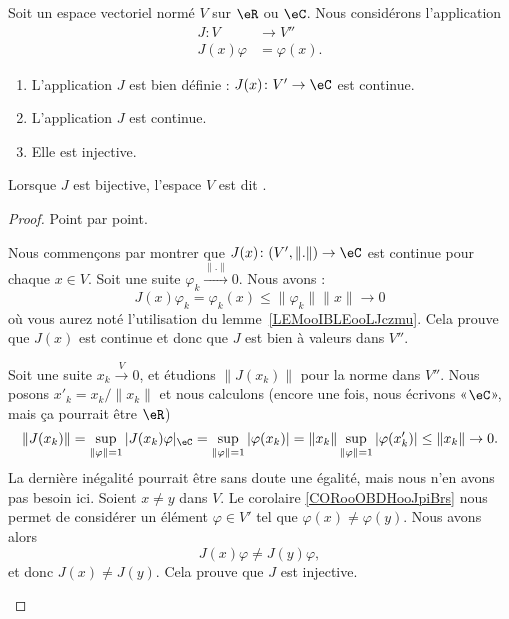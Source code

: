 \begin{propositionDef}      \label{PROPooMAQSooCGFBBM}
	Soit un espace vectoriel normé \( V\) sur \( \eR\) ou \( \eC\). Nous considérons l'application
	\begin{equation}
		\begin{aligned}
			J\colon V   & \to V''       \\
			J(x)\varphi & = \varphi(x).
		\end{aligned}
	\end{equation}
	\begin{enumerate}
		\item       \label{ITEMooNVVSooNFXgnE}
		      L'application \( J\) est bien définie : \( J(x)\colon V'\to \eC\) est continue.
		\item       \label{ITEMooKURHooZZWpbu}
		      L'application \( J\) est continue.
		\item       \label{ITEMooTFYVooKhMOjp}
		      Elle est injective.
	\end{enumerate}

	Lorsque \( J\) est bijective, l'espace \( V\) est dit .
\end{propositionDef}

\begin{proof}
	Point par point.
	\begin{subproof}
		\spitem[\ref{ITEMooNVVSooNFXgnE}]
		Nous commençons par montrer que \( J(x)\colon (V',\| . \|)\to \eC\) est continue pour chaque \( x\in V\). Soit une suite \( \varphi_k\stackrel{\| . \|}{\longrightarrow}0\). Nous avons :
		\begin{equation}
			J(x)\varphi_k=\varphi_k(x)\leq \| \varphi_k \|\| x \|\to 0
		\end{equation}
		où vous aurez noté l'utilisation du lemme~\ref{LEMooIBLEooLJczmu}.  Cela prouve que \( J(x)\) est continue et donc que \( J\) est bien à valeurs dans \( V''\).
		\spitem[\ref{ITEMooKURHooZZWpbu}]

		Soit une suite \( x_k\stackrel{V}{\longrightarrow}0\), et étudions \( \| J(x_k) \|\) pour la norme dans \( V''\). Nous posons \( x'_k=x_k/\| x_k \|\) et nous calculons (encore une fois, nous écrivons «\( \eC\)», mais ça pourrait être \( \eR\))
		\begin{equation}
			\| J(x_k) \|=\sup_{\| \varphi \|=1}| J(x_k)\varphi |_{\eC}=\sup_{\| \varphi \|=1}| \varphi(x_k) |=\| x_k \|\sup_{\| \varphi \|=1}| \varphi(x'_k) |\leq \| x_k \|\to 0.
		\end{equation}
		La dernière inégalité pourrait être sans doute une égalité, mais nous n'en avons pas besoin ici.
		\spitem[\ref{ITEMooTFYVooKhMOjp}]
		Soient \( x\neq y\) dans \( V\). Le corolaire \ref{CORooOBDHooJpiBrs} nous permet de considérer un élément \( \varphi\in V'\) tel que \( \varphi(x)\neq \varphi(y)\). Nous avons alors
		\begin{equation}
			J(x)\varphi\neq J(y)\varphi,
		\end{equation}
		et donc \( J(x)\neq J(y)\). Cela prouve que \( J\) est injective.
	\end{subproof}
\end{proof}

